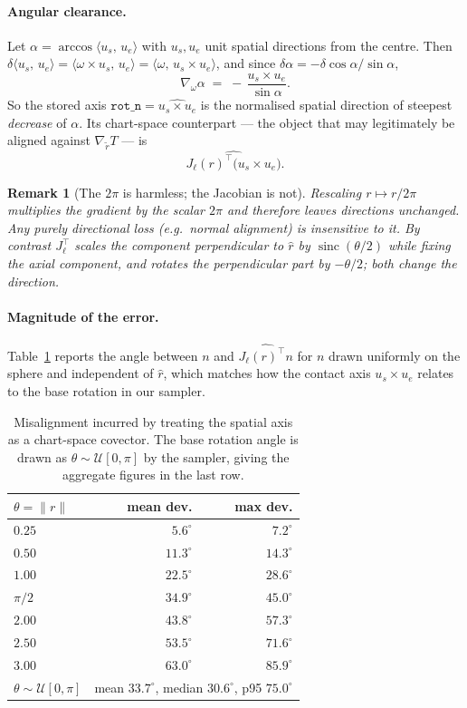 \documentclass[11pt]{article}
\newtheorem{remark}[proposition]{Remark}
\theoremstyle{definition}
\DeclareMathOperator{\sinc}{sinc}
\newcommand{\ip}[2]{\langle #1,\, #2 \rangle}
\newcommand{\Jl}{J_{\ell}}
\begin{document}
\paragraph{Angular clearance.}
Let $\alpha=\arccos\ip{u_s}{u_e}$ with $u_s,u_e$ unit spatial directions from
the centre. Then $\delta\ip{u_s}{u_e} = \ip{\omega\times u_s}{u_e}
= \ip{\omega}{u_s\times u_e}$, and since
$\delta\alpha = -\delta\cos\alpha/\sin\alpha$,
\[
  \nabla_\omega \alpha \;=\; -\,\frac{u_s\times u_e}{\sin\alpha}.
\]
So the stored axis $\texttt{rot\_n}=\widehat{u_s\times u_e}$ is the normalised
spatial direction of steepest \emph{decrease} of $\alpha$. Its chart-space
counterpart --- the object that may legitimately be aligned against
$\nabla_{\tilde r}T$ --- is
\[
  \widehat{\Jl(r)^{\!\top}\big(u_s\times u_e\big)}.
\]

\begin{remark}[The $2\pi$ is harmless; the Jacobian is not]
Rescaling $r\mapsto r/2\pi$ multiplies the gradient by the scalar $2\pi$ and
therefore leaves \emph{directions} unchanged. Any purely directional loss (e.g.\
normal alignment) is insensitive to it. By contrast $\Jl^{\!\top}$ scales the
component perpendicular to $\hat r$ by $\sinc(\theta/2)$ while fixing the axial
component, \emph{and} rotates the perpendicular part by $-\theta/2$; both change
the direction.
\end{remark}

\paragraph{Magnitude of the error.}
Table~\ref{tab:err} reports the angle between $n$ and
$\widehat{\Jl(r)^{\!\top}n}$ for $n$ drawn uniformly on the sphere and
independent of $\hat r$, which matches how the contact axis $u_s\times u_e$
relates to the base rotation in our sampler.

\begin{table}[h]
\centering
\begin{tabular}{lrr}
\toprule
$\theta=\lVert r\rVert$ & mean dev. & max dev. \\
\midrule
$0.25$   & $5.6^{\circ}$  & $7.2^{\circ}$ \\
$0.50$   & $11.3^{\circ}$ & $14.3^{\circ}$ \\
$1.00$   & $22.5^{\circ}$ & $28.6^{\circ}$ \\
$\pi/2$  & $34.9^{\circ}$ & $45.0^{\circ}$ \\
$2.00$   & $43.8^{\circ}$ & $57.3^{\circ}$ \\
$2.50$   & $53.5^{\circ}$ & $71.6^{\circ}$ \\
$3.00$   & $63.0^{\circ}$ & $85.9^{\circ}$ \\
\midrule
$\theta\sim\mathcal{U}[0,\pi]$ & \multicolumn{2}{c}{mean $33.7^{\circ}$,\; median $30.6^{\circ}$,\; p95 $75.0^{\circ}$} \\
\bottomrule
\end{tabular}
\caption{Misalignment incurred by treating the spatial axis as a chart-space
covector. The base rotation angle is drawn as $\theta\sim\mathcal{U}[0,\pi]$ by
the sampler, giving the aggregate figures in the last row.}
\label{tab:err}
\end{table}
\end{document}
